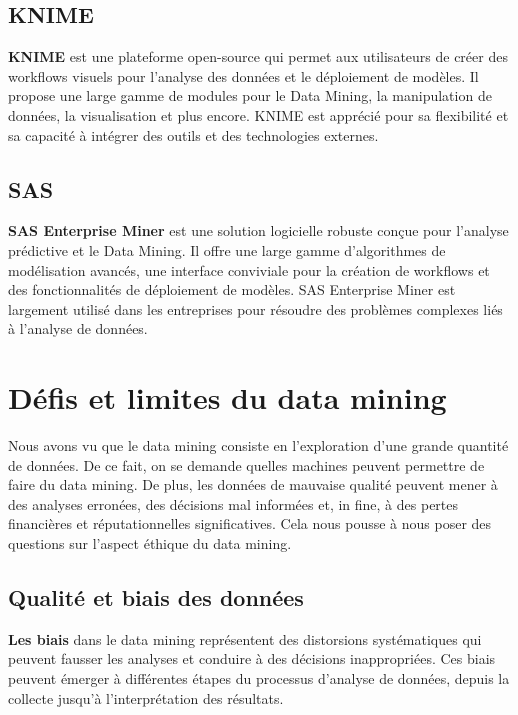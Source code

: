 \documentclass[a4paper,12pt]{article}
\begin{document}
    
    \subsection{KNIME}
    \textbf{KNIME} est une plateforme open-source qui permet aux utilisateurs de créer des workflows visuels pour l’analyse des données et le déploiement de modèles. Il propose une large gamme de modules pour le Data Mining, la manipulation de données, la visualisation et plus encore. KNIME est apprécié pour sa flexibilité et sa capacité à intégrer des outils et des technologies externes.
    
    \subsection{SAS}
    \textbf{SAS Enterprise Miner} est une solution logicielle robuste conçue pour l’analyse prédictive et le Data Mining. Il offre une large gamme d’algorithmes de modélisation avancés, une interface conviviale pour la création de workflows et des fonctionnalités de déploiement de modèles. SAS Enterprise Miner est largement utilisé dans les entreprises pour résoudre des problèmes complexes liés à l’analyse de données.



\section{Défis et limites du data mining}
	Nous avons vu que le data mining consiste en l’exploration d’une grande quantité de données. De ce fait, on se demande quelles machines peuvent permettre de faire du data mining. De plus, les données de mauvaise qualité peuvent mener à des analyses erronées, des décisions mal informées et, in fine, à des pertes financières et réputationnelles significatives. Cela nous pousse à nous poser des questions sur l’aspect éthique du data mining. 

	\subsection{Qualité et biais des données}
	    \textbf{Les biais} dans le data mining représentent des distorsions systématiques qui peuvent fausser les analyses et conduire à des décisions inappropriées. Ces biais peuvent émerger à différentes étapes du processus d'analyse de données, depuis la collecte jusqu'à l'interprétation des résultats.
\end{document}
